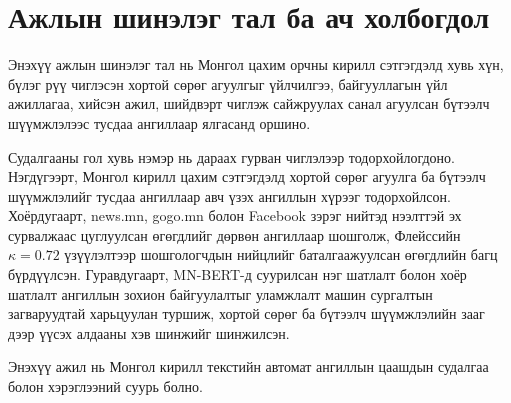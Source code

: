 \section{Ажлын шинэлэг тал ба ач холбогдол}

Энэхүү ажлын шинэлэг тал нь Монгол цахим орчны кирилл сэтгэгдэлд хувь хүн,
бүлэг рүү чиглэсэн хортой сөрөг агуулгыг үйлчилгээ, байгууллагын үйл ажиллагаа,
хийсэн ажил, шийдвэрт чиглэж сайжруулах санал агуулсан бүтээлч шүүмжлэлээс
тусдаа ангиллаар ялгасанд оршино.

Судалгааны гол хувь нэмэр нь дараах гурван чиглэлээр тодорхойлогдоно.
Нэгдүгээрт, Монгол кирилл цахим сэтгэгдэлд хортой сөрөг агуулга ба бүтээлч
шүүмжлэлийг тусдаа ангиллаар авч үзэх ангиллын хүрээг тодорхойлсон.
Хоёрдугаарт, news.mn, gogo.mn болон Facebook зэрэг нийтэд нээлттэй эх сурвалжаас
цуглуулсан өгөгдлийг дөрвөн ангиллаар шошголж, Флейссийн $\kappa = 0.72$
үзүүлэлтээр шошгологчдын нийцлийг баталгаажуулсан өгөгдлийн багц бүрдүүлсэн.
Гуравдугаарт, MN-BERT-д суурилсан нэг шатлалт болон хоёр шатлалт ангиллын
зохион байгуулалтыг уламжлалт машин сургалтын загваруудтай харьцуулан туршиж,
хортой сөрөг ба бүтээлч шүүмжлэлийн зааг дээр үүсэх алдааны хэв шинжийг
шинжилсэн.

Энэхүү ажил нь Монгол кирилл текстийн автомат ангиллын цаашдын судалгаа болон
хэрэглээний суурь болно.
